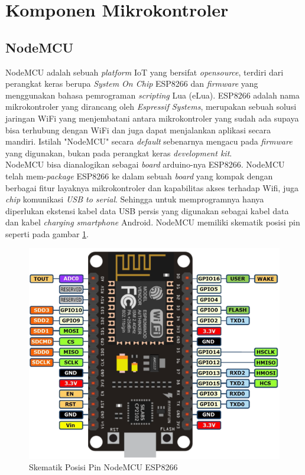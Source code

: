 \section{Komponen Mikrokontroler}

\subsection{NodeMCU}
\tab NodeMCU adalah sebuah \textit{platform} IoT yang bersifat \textit{opensource}, terdiri dari perangkat keras berupa \textit{System On Chip} ESP8266 dan \textit{firmware} yang menggunakan bahasa pemrograman \textit{scripting} Lua (eLua). ESP8266 adalah nama mikrokontroler yang dirancang oleh \textit{Espressif Systems}, merupakan sebuah solusi jaringan WiFi yang menjembatani antara mikrokontroler yang sudah ada supaya bisa terhubung dengan WiFi dan juga dapat menjalankan aplikasi secara mandiri. Istilah "NodeMCU" secara \textit{default} sebenarnya mengacu pada \textit{firmware} yang digunakan, bukan pada perangkat keras \textit{development kit}.\\
\tab NodeMCU bisa dianalogikan sebagai \textit{board} arduino-nya ESP8266. NodeMCU telah mem-\textit{package} ESP8266 ke dalam sebuah \textit{board} yang kompak dengan berbagai fitur layaknya mikrokontroler dan kapabilitas akses terhadap Wifi, juga \textit{chip} komunikasi \textit{USB to serial}. Sehingga untuk memprogramnya hanya diperlukan ekstensi kabel data USB persis yang digunakan sebagai kabel data dan kabel \textit{charging smartphone} Android. NodeMCU memiliki skematik posisi pin seperti pada gambar \ref{figure:pinout-nodemcu}.

\begin{figure}[H]
	\centerline {
		\includegraphics[width=\linewidth]{bab3/img/pinout-nodemcu.png}
	}
	\caption{Skematik Posisi Pin NodeMCU ESP8266}
	\label{figure:pinout-nodemcu}
\end{figure}

